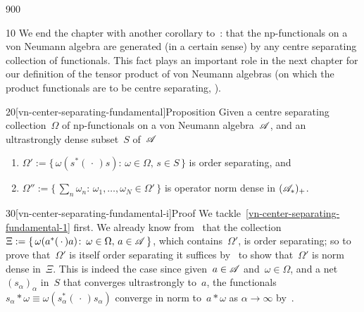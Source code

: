 \begin{parsec}{900}%
\begin{point}{10}%
We end the chapter 
with another corollary to~:
 that  the np-functionals
on a von Neumann algebra
are generated (in a certain sense)
by any centre separating collection
of functionals. This fact plays
an important role
in the next chapter
for our definition of the tensor product
of von Neumann algebras
(on which the product functionals are to be centre separating,
).
\end{point}
\begin{point}{20}[vn-center-separating-fundamental]{Proposition}%
Given a centre separating collection~$\Omega$ of np-functionals
on a von Neumann algebra~$\mathscr{A}$,
and an ultrastrongly dense subset~$S$ of~$\mathscr{A}$
\begin{enumerate}
\item
	\label{vn-center-separating-fundamental-1}
$\Omega':= \{\,\omega(s^*(\,\cdot\,)s)\colon\,
\omega\in\Omega,\,s\in S\,\}$
is order separating, and
\item
	\label{vn-center-separating-fundamental-2}
$\Omega'':=\{\,\sum_n\omega_n\colon\, \omega_1,\dotsc,\omega_N\in\Omega'\,\}$ is operator norm dense in $(\mathscr{A}_*)_+$.
	\end{enumerate}
\begin{point}{30}[vn-center-separating-fundamental-i]{Proof}%
We tackle~\ref{vn-center-separating-fundamental-1}
first. We already know from~
that the collection $\Xi:=\{\, \omega(a^*(\,\cdot\,)a)\colon\, 
\omega\in\Omega,\, a\in\mathscr{A}\,\}$,
which contains~$\Omega'$, is order separating;
so to prove that~$\Omega'$ is itself order separating
it suffices by~ to show that~$\Omega'$
is norm dense in~$\Xi$.
This is indeed the case
since given~$a\in\mathscr{A}$
and~$\omega\in\Omega$,
and a net~$(s_\alpha)_\alpha$ in~$S$
that converges ultrastrongly to~$a$,
the functionals~$s_\alpha \ast\omega
\equiv \omega(s_\alpha^*(\,\cdot\,)s_\alpha)$
converge in norm to~$a\ast \omega$
as $\alpha\to\infty$
by~.


\end{point}
\end{point}
\end{parsec}
